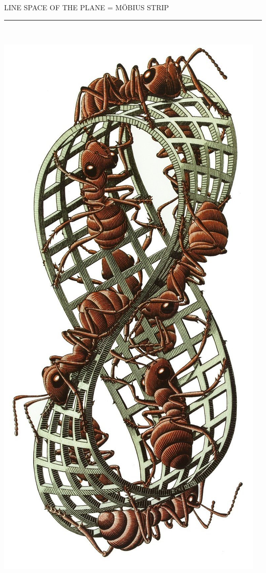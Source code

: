 \documentclass[12pt,titlepage,landscape,a4paper]{article}
\newcommand{\textemoyen}{\fontsize{23}{27}\selectfont}
\newenvironment{slide}[1]
{
\newpage
\begin{center}
{\blue \textemoyen \uppercase{#1}}\\
\end{center}
\vspace{-1cm}
\rule{\textwidth}{0.5 pt}\\
\vspace{-.8cm}
}
{\vspace*{-3cm}}
\newcommand{\blue}{\color{blue}} %
\begin{document}

\begin{slide}{LINE SPACE OF THE PLANE = M\"OBIUS STRIP}

\centerline{\includegraphics[angle=-90,scale=2]{MoebiusBand}}

\end{slide}
\end{document}
